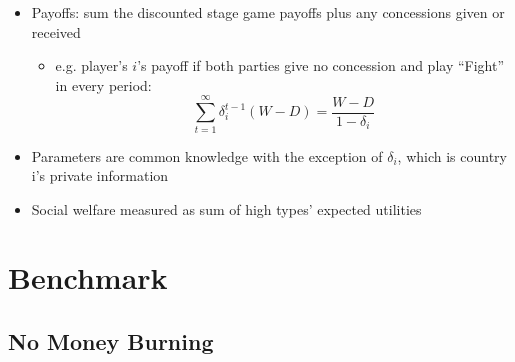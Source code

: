 \documentclass[handout]{beamer}
\newcommand{\de}{\delta}
\begin{document}

\begin{frame}
\begin{itemize}[<+->]
	\item Payoffs: sum the discounted stage game payoffs plus any concessions given or received
		\begin{itemize}
			\item e.g. player's $i$'s payoff if both parties give no concession and play ``Fight'' in every period: $$\sum_{t=1}^\infty \de_i^{t-1} (W-D) = \frac{W-D}{1-\de_i}$$
		\end{itemize}
	\item Parameters are common knowledge with the exception of $\delta_i$, which is country i's private information
	\item Social welfare measured as sum of high types' expected utilities
\end{itemize}
\end{frame}


\section{Benchmark}
\subsection{No Money Burning}
\end{document}
